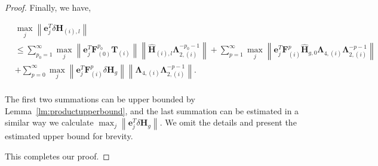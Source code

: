 \documentclass[twoside,11pt]{article}
\newcommand{\norm}[1]{\left\lVert#1\right\rVert}
\newcommand{\matF}{\mathbf{F}}
\newcommand{\hmatH}{{\hat{\mathbf{H}}}{}}
\newcommand{\matT}{\mathbf{T}}
\newcommand{\matLambda}{\mathbf{\Lambda}}
\newcommand{\dtmatH}{\delta\mathbf{H}}
\newcommand{\vece}{\mathbf{e}}
\begin{document}
\begin{proof}
Finally, we have,

\begin{align*}
&\max_j\norm{\vece_j^T\dtmatH_{(i),l}}\\
&\le \sum_{p_0=1}^\infty \max_j\norm{\vece_j^T\matF_{(0)}^{p_0}\matT_{(i)}}\norm{\hmatH_{(i),l}\matLambda_{2,(i)}^{-p_{0}-1}}+\sum_{p=1}^{\infty}\max_j\norm{\vece_j^T\matF_{(i)}^p\hmatH_{g,0}\matLambda_{4,(i)}\matLambda_{2,(i)}^{-p-1}}\\
&+\sum_{p=0}^{\infty}\max_j\norm{\vece_j^T\matF_{(i)}^p\dtmatH_{g}}\norm{\matLambda_{4,(i)}\matLambda_{2,(i)}^{-p-1}}.\\
\end{align*}

The first two summations can be upper bounded by Lemma~\ref{lm:productupperbound}, and the last summation can be estimated in a similar way we calculate $\max_j\norm{\vece_j^T\dtmatH_{g}}$. We omit the details and present the estimated upper bound for brevity.


This completes our proof.
\end{proof}
\end{document}
